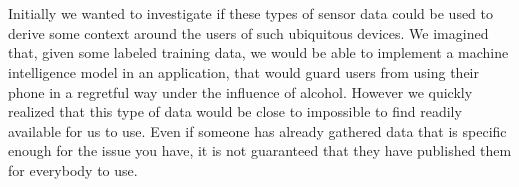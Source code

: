 \\\\
Initially we wanted to investigate if these types of sensor data could be used to derive some context around the users of such ubiquitous devices. We imagined that, given some labeled training data, we would be able to implement a machine intelligence model in an application, that would guard users from using their phone in a regretful way under the influence of alcohol. However we quickly realized that this type of data would be close to impossible to find readily available for us to use. Even if someone has already gathered data that is specific enough for the issue you have, it is not guaranteed that they have published them for everybody to use.
